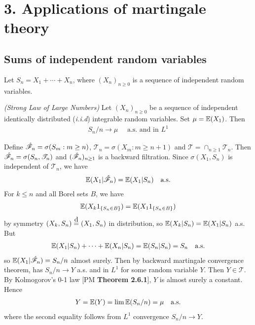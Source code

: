 \documentclass[10pt,a4paper]{report}
\newcommand\xeq{\stackrel{\mathclap{\normalfont\mbox{d}}}{=}}
\newenvironment{proof}
{\begin{changemargin}{1cm}{0.5cm} 
	}%
	{\end{changemargin}
}
\begin{document}
\section*{3. Applications of martingale theory}

\subsection*{Sums of independent random variables}

\newcommand{\T}{\mathscr{T}}

Let $S_n = X_1 + \cdots + X_n$, where $(X_n)_{n\geq 0}$ is a sequence of independent random variables.
\s

 \emph{(Strong Law of Large Numbers)} Let $(X_n)_{n\geq 0}$ be a sequence of independent identically distributed (\emph{i.i.d}) integrable random variables. Set $\mu = \mathbb{E}(X_{1})$. Then
\begin{align*}
S_n / n \rightarrow \mu \quad \text{ a.s. and in } L^1
\end{align*}
\begin{proof}
\pf Define $\hat{\mathscr{F}}_n = \sigma(S_m : m\geq n)$, $\T_n = \sigma(X_m : m\geq n+1)$ and $\T = \cap_{n\geq 1} \T_n$. Then $\hat{\F}_n = \sigma(S_n, \T_n)$ and $(\hat{\mathscr{F}}_n)_{n\geq 1}$ is a backward filtration. Since $\sigma(X_1, S_n)$ is independent of $\T_n$, we have
\begin{align*}
\mathbb{E}(X_1 |\hat{\mathscr{F}}_n) = \mathbb{E}(X_1 |S_n) \quad \text{a.s.}
\end{align*} 
For $k\leq n$ and all Borel sets $B$, we have
\begin{align*}
\mathbb{E}(X_k 1_{ \{S_n \in B \} }) = \mathbb{E}(X_1 1_{\{S_n \in B \} })
\end{align*}
by symmetry $(X_k, S_n) \xeq (X_1, S_n)$ in distribution, so $\mathbb{E}(X_k | S_n) = \mathbb{E}(X_1 |S_n)$ a.s. But
\begin{align*}
\mathbb{E}(X_1 |S_n)+ \cdots + \mathbb{E}(X_n|S_n) = \mathbb{E}(S_n |S_n) = S_n \quad \text{a.s.}
\end{align*} 
so $\mathbb{E}(X_1 |\hat{\mathscr{F}}_n) = S_n /n$ almost surely. Then by backward martingale convergence theorem, has $S_n/n\rightarrow Y$ a.s. and in $L^1$ for some random variable $Y$. Then $Y\in \T$. By Kolmogorov's 0-1 law [PM \textbf{Theorem 2.6.1}], $Y$ is almost surely a constant. Hence
\begin{align*}
Y = \mathbb{E}(Y) = \lim \mathbb{E}(S_n/n) = \mu \quad \text{a.s.}
\end{align*}
where the second equality follows from $L^1$ convergence $S_n/n\rightarrow Y$.

\eop
\end{proof}
\s
\end{document}
